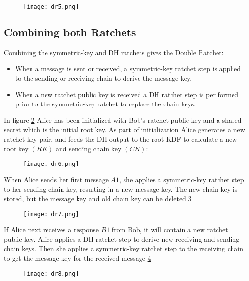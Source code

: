 \begin{figure}[ht!]
  \centering
  \texttt{[image: dr5.png]}
  \caption{}
  \label{fig:dr5}
\end{figure}

\subsection{Combining both Ratchets}
\label{subsec:CombiningBothRatchets}

Combining the symmetric-key and DH ratchets gives the Double Ratchet:

\begin{itemize}
  \item When a message is sent or received, a symmetric-key ratchet step is applied to the sending or receiving chain to derive the message key.
  \item When a new ratchet public key is received a DH ratchet step is per formed prior to the symmetric-key ratchet to replace the chain keys.
\end{itemize}

In figure \ref{fig:dr6} Alice has been initialized with Bob's ratchet public key and a shared secret which is the initial root key. As part of initialization Alice generates a new ratchet key pair, and feeds the DH output to the root KDF to calculate a new root key $(RK)$ and sending chain key $(CK)$:

\begin{figure}[ht!]
  \centering
  \texttt{[image: dr6.png]}
  \caption{}
  \label{fig:dr6}
\end{figure}

When Alice sends her first message $A1$, she applies a symmetric-key ratchet step to her sending chain key, resulting in a new message key. The new chain key is stored, but the message key and old chain key can be deleted \ref{fig:dr7}

\begin{figure}[ht!]
  \centering
  \texttt{[image: dr7.png]}
  \caption{}
  \label{fig:dr7}
\end{figure}

If Alice next receives a response $B1$ from Bob, it will contain a new ratchet public key. Alice applies a DH ratchet step to derive new receiving and sending chain keys. Then she applies a symmetric-key ratchet step to the receiving chain to get the message key for the received message \ref{fig:dr8}

\begin{figure}[ht!]
  \centering
  \texttt{[image: dr8.png]}
  \caption{}
  \label{fig:dr8}
\end{figure}


